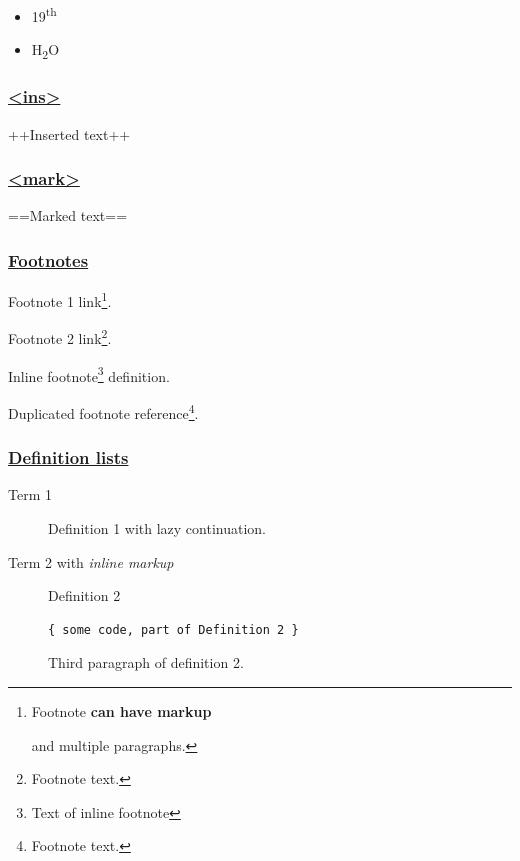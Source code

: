 \documentclass[
  paper=a4,
  ,captions=tableheading
]{scrartcl}
\providecommand{\tightlist}{%
  \setlength{\itemsep}{0pt}\setlength{\parskip}{0pt}}
\begin{document}
\begin{itemize}
\tightlist
\item
  19\textsuperscript{th}
\item
  H\textsubscript{2}O
\end{itemize}

\hypertarget{ins}{%
\subsubsection{\texorpdfstring{\href{https://github.com/markdown-it/markdown-it-ins}{\textless ins\textgreater{}}}{\textless ins\textgreater{}}}\label{ins}}

++Inserted text++

\hypertarget{mark}{%
\subsubsection{\texorpdfstring{\href{https://github.com/markdown-it/markdown-it-mark}{\textless mark\textgreater{}}}{\textless mark\textgreater{}}}\label{mark}}

==Marked text==

\hypertarget{footnotes}{%
\subsubsection{\texorpdfstring{\href{https://github.com/markdown-it/markdown-it-footnote}{Footnotes}}{Footnotes}}\label{footnotes}}

Footnote 1 link\footnote{Footnote \textbf{can have markup}

  and multiple paragraphs.}.

Footnote 2 link\footnote{Footnote text.}.

Inline footnote\footnote{Text of inline footnote} definition.

Duplicated footnote reference\footnote{Footnote text.}.

\hypertarget{definition-lists}{%
\subsubsection{\texorpdfstring{\href{https://github.com/markdown-it/markdown-it-deflist}{Definition
lists}}{Definition lists}}\label{definition-lists}}

\begin{description}
\item[Term 1]
Definition 1 with lazy continuation.
\item[Term 2 with \emph{inline markup}]
Definition 2

\begin{lstlisting}
{ some code, part of Definition 2 }
\end{lstlisting}

Third paragraph of definition 2.
\end{description}
\end{document}
